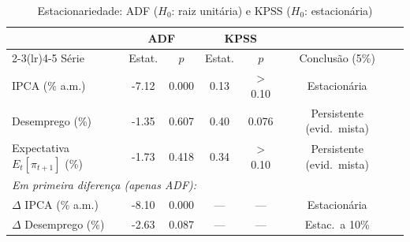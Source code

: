 \begin{table}[htbp]
\centering
\caption{Estacionariedade: ADF ($H_0$: raiz unitária) e KPSS ($H_0$: estacionária)}
\label{tab:adf}
\begin{tabular}{lcccccc}
\toprule
& \multicolumn{2}{c}{ADF} & \multicolumn{2}{c}{KPSS} & \\
\cmidrule(lr){2-3}\cmidrule(lr){4-5}
Série & Estat. & $p$ & Estat. & $p$ & Conclusão (5\%) \\
\midrule
IPCA (\% a.m.) & -7.12 & 0.000 & 0.13 & $>$0.10 & Estacionária \\
Desemprego (\%) & -1.35 & 0.607 & 0.40 & 0.076 & Persistente (evid.\ mista) \\
Expectativa $E_t[\pi_{t+1}]$ (\%) & -1.73 & 0.418 & 0.34 & $>$0.10 & Persistente (evid.\ mista) \\
\midrule
\multicolumn{6}{l}{\textit{Em primeira diferença (apenas ADF):}} \\
$\Delta$ IPCA (\% a.m.) & -8.10 & 0.000 & --- & --- & Estacionária \\
$\Delta$ Desemprego (\%) & -2.63 & 0.087 & --- & --- & Estac.\ a 10\% \\
\bottomrule
\end{tabular}
\end{table}
